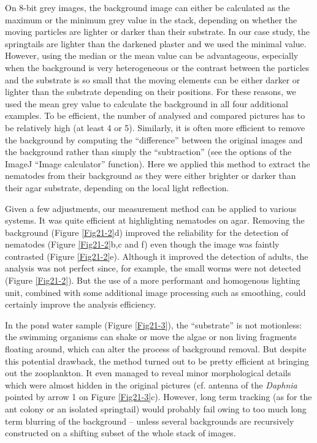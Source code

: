 On 8-bit grey images, the background image can either be calculated as the
maximum or the minimum grey value in the stack, depending on whether the moving
particles are lighter or darker than their substrate. In our case study, the
springtails are lighter than the darkened plaster and we used the minimal value.
However, using the median or the mean value can be advantageous, especially when
the background is very heterogeneous or the contrast between the particles and
the substrate is so small that the moving elements can be either darker or
lighter than the substrate depending on their positions. For these reasons, we
used the mean grey value to calculate the background in all four additional
examples. To be efficient, the number of analysed and compared pictures has to
be relatively high (at least 4 or 5). Similarly, it is often more efficient to
remove the background by computing the “difference” between the original images
and the background rather than simply the “subtraction” (see the options of the
ImageJ “Image calculator” function). Here we applied this method to extract the
nematodes from their background as they were either brighter or darker than
their agar substrate, depending on the local light reflection.

Given a few adjustments, our measurement method can be applied to various
systems. It was quite efficient at highlighting nematodes on agar. Removing the
background (Figure \ref{Fig21-2}d) improved the reliability for the detection of nematodes
(Figure \ref{Fig21-2}b,c and f) even though the image was faintly contrasted (Figure \ref{Fig21-2}e).
Although it improved the detection of adults, the analysis was not perfect
since, for example, the small worms were not detected (Figure \ref{Fig21-2}). But the use of
a more performant and homogenous lighting unit, combined with some additional
image processing such as smoothing, could certainly improve the analysis
efficiency.

In the pond water sample (Figure \ref{Fig21-3}), the “substrate” is not motionless: the
swimming organisms can shake or move the algae or non living fragments floating
around, which can alter the process of background removal. But despite this
potential drawback, the method turned out to be pretty efficient at bringing out
the zooplankton. It even managed to reveal minor morphological details which
were almost hidden in the original pictures (cf. antenna of the \textit{Daphnia} pointed
by arrow 1 on Figure \ref{Fig21-3}c). However, long term tracking (as for the ant colony or
an isolated springtail) would probably fail owing to too much long term blurring
of the background – unless several backgrounds are recursively constructed on a
shifting subset of the whole stack of images.


